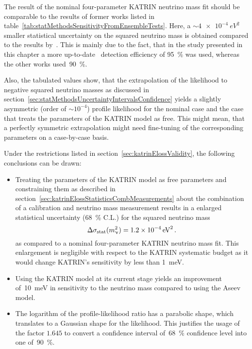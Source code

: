 The result of the nominal four-parameter KATRIN neutrino mass fit should be comparable to the results of former works listed in table~\ref{tab:statMethodsSensitivityFromEnsembleTests}. Here, a $\sim\SI{4e-4}{eV^2}$ smaller statistical uncertainty on the squared neutrino mass is obtained compared to the results by~\cite{Kleesiek2014, Hoetzel2012}. This is mainly due to the fact, that in the study presented in this chapter a more up-to-date~\cite{Amsbaugh2015} detection efficiency of \SI{95}{\percent} was used, whereas the other works used~\SI{90}{\percent}. 

Also, the tabulated values show, that the extrapolation of the likelihood to negative squared neutrino masses as discussed in section~\ref{sec:statMethodsUncertaintyIntervalsConfidence} yields a slightly asymmetric (order of $\sim10^{-4}$) profile likelihood for the nominal case and the case that treats the parameters of the KATRIN model as free. This might mean, that a perfectly symmetric extrapolation might need fine-tuning of the corresponding parameters on a case-by-case basis.

Under the restrictions listed in section~\ref{sec:katrinElossValidity}, the following conclusions can be drawn:
\begin{itemize}
	\item Treating the parameters of the KATRIN model as free parameters and constraining them as described in section~\ref{sec:katrinElossStatisticsCombMeasurements} about the combination of a calibration and neutrino mass measurement results in a enlarged statistical uncertainty (\SI{68}{\percent} C.L.) for the squared neutrino mass
	\begin{equation}
		\label{eq:katrinElossModelResultsAsimovEnlargedStatUncert}
		\Delta\sigma_\mathrm{stat}(m_\upnu^2) = \SI{1.2e-4}{eV^2}
		\text{\,.} 
	\end{equation} 
	as compared to a nominal four-parameter KATRIN neutrino mass fit. This enlargement is negligible with respect to the KATRIN systematic budget as it would change KATRIN's sensitivity by less than \SI{1}{meV}.
	\item Using the KATRIN model at its current stage yields an improvement of~\SI{10}{meV} in sensitivity to the neutrino mass compared to using the Aseev model.
	\item The logarithm of the profile-likelihood ratio has a parabolic shape, which translates to a Gaussian shape for the likelihood. This justifies the usage of the factor $1.645$ to convert a confidence interval of~\SI{68}{\percent} confidence level into one of~\SI{90}{\percent}.
\end{itemize}

